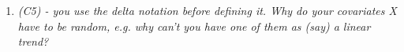 \documentclass[a4paper,12pt]{article}
\begin{document}
\begin{enumerate}[label=\arabic*.,leftmargin=0.6cm]
We have revised the text in Section 2.2, p.6/7 of the paper to make the above points clearer.






\item {\color{black}\textit{(C5) - you use the delta notation before defining it. Why do your covariates X have to be random, e.g. why can’t you have one of them as (say) a linear trend?}}


\end{enumerate}
\end{document}
